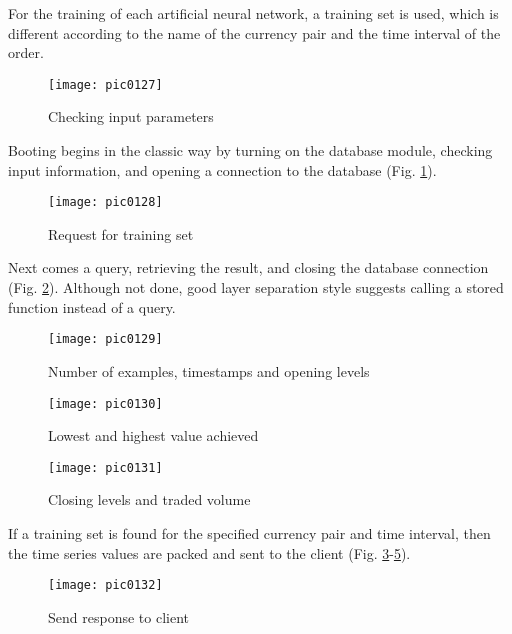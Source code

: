For the training of each artificial neural network, a training set is used, which is different according to the name of the currency pair and the time interval of the order.

\begin{figure}[h]
\centering
\texttt{[image: pic0127]}
\caption{Checking input parameters}
\label{fig:pic0127}
\end{figure}
\FloatBarrier

Booting begins in the classic way by turning on the database module, checking input information, and opening a connection to the database (Fig. \ref{fig:pic0127}).

\begin{figure}[h]
\centering
\texttt{[image: pic0128]}
\caption{Request for training set}
\label{fig:pic0128}
\end{figure}
\FloatBarrier

Next comes a query, retrieving the result, and closing the database connection (Fig. \ref{fig:pic0128}). Although not done, good layer separation style suggests calling a stored function instead of a query.

\begin{figure}[h]
\centering
\texttt{[image: pic0129]}
\caption{Number of examples, timestamps and opening levels}
\label{fig:pic0129}
\end{figure}
\FloatBarrier

\begin{figure}[h]
\centering
\texttt{[image: pic0130]}
\caption{Lowest and highest value achieved}
\label{fig:pic0130}
\end{figure}
\FloatBarrier

\begin{figure}[h]
\centering
\texttt{[image: pic0131]}
\caption{Closing levels and traded volume}
\label{fig:pic0131}
\end{figure}
\FloatBarrier

If a training set is found for the specified currency pair and time interval, then the time series values are packed and sent to the client (Fig. \ref{fig:pic0129}-\ref{fig:pic0131}).

\begin{figure}[h]
\centering
\texttt{[image: pic0132]}
\caption{Send response to client}
\label{fig:pic0132}
\end{figure}
\FloatBarrier

